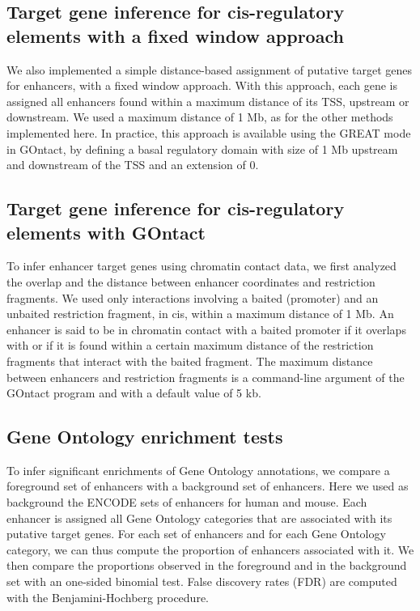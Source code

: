 \subsection{Target gene inference for \acrshort{cis}-regulatory elements with a fixed window approach}
We also implemented a simple distance-based assignment of putative target genes for enhancers, with a fixed window approach. With this approach, each gene is assigned  all enhancers found within a maximum distance of its TSS, upstream or downstream. We used a maximum distance of 1 Mb, as for the other methods implemented here. In practice, this approach is available using the GREAT mode in GOntact, by defining a basal regulatory domain with size of 1 Mb upstream and downstream of the TSS and an extension of 0. 

\subsection{Target gene inference for \acrshort{cis}-regulatory elements with GOntact}
To infer enhancer target genes using chromatin contact data, we first analyzed the overlap and the distance between enhancer coordinates and restriction fragments. We used only interactions involving a baited (promoter) and an unbaited restriction fragment, in cis, within a maximum distance of 1 Mb. An enhancer is said to be in chromatin contact with a baited promoter if it overlaps with or if it is found within a certain maximum distance of the restriction fragments that interact with the baited fragment. The maximum distance between enhancers and restriction fragments is a command-line argument of the GOntact program and with a default value of 5 kb. 

\subsection{Gene Ontology enrichment tests}
To infer significant enrichments of Gene Ontology annotations, we compare a foreground set of enhancers with a background set of enhancers. Here we used as background the ENCODE sets of enhancers for human and mouse. Each enhancer is assigned all Gene Ontology categories that are associated with its putative target genes. For each set of enhancers and for each Gene Ontology category, we can thus compute the proportion  of enhancers associated with it. We then compare the proportions observed in the foreground and in the background set with an one-sided binomial test. False discovery rates (FDR) are computed with the Benjamini-Hochberg procedure.

